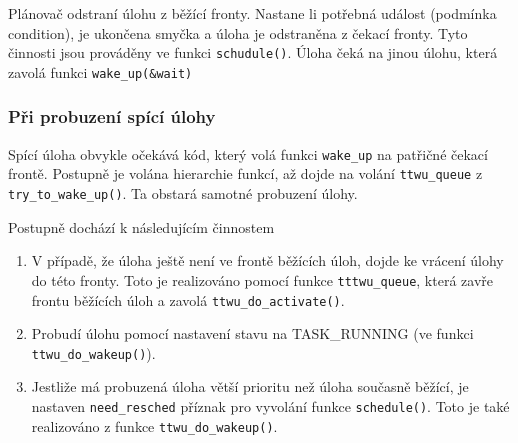 \documentclass[a4paper,12pt]{article}
\begin{document}
Plánovač odstraní úlohu z běžící fronty. Nastane li potřebná událost \linebreak (podmínka condition), je ukončena smyčka a úloha je odstraněna z čekací fronty. Tyto činnosti jsou prováděny ve funkci \verb#schudule()#.
Úloha čeká na jinou úlohu, která zavolá funkci \verb#wake_up(&wait)#

\subsubsection{Při probuzení spící úlohy}


Spící úloha obvykle očekává kód, který volá funkci \verb#wake_up# na patřičné čekací frontě. Postupně je volána hierarchie funkcí, až dojde na volání \verb#ttwu_queue# z \verb#try_to_wake_up()#. Ta obstará samotné probuzení úlohy.  

Postupně dochází k následujícím činnostem
\begin{enumerate}
\item V případě, že úloha ještě není ve frontě běžících úloh, dojde ke vrácení úlohy do této fronty. Toto je realizováno pomocí funkce \verb#tttwu_queue#, která zavře frontu běžících úloh a zavolá \verb#ttwu_do_activate()#.
\item Probudí úlohu pomocí nastavení stavu na TASK\_RUNNING (ve funkci \verb#ttwu_do_wakeup()#).
\item Jestliže má probuzená úloha větší prioritu než úloha současně běžící, je nastaven \verb#need_resched# příznak pro vyvolání funkce \verb#schedule()#. Toto je také realizováno z funkce \verb#ttwu_do_wakeup()#.
\end{enumerate}
\end{document}

